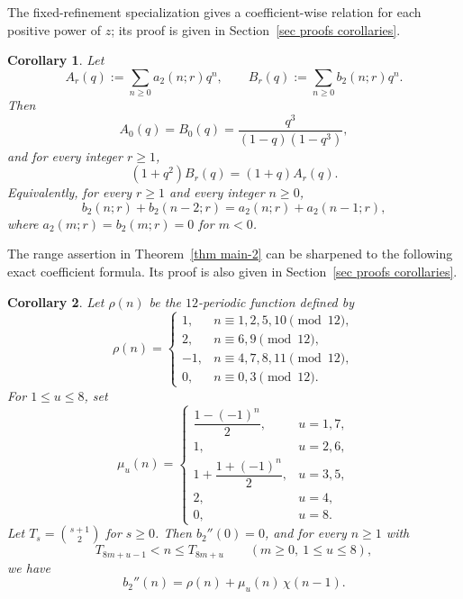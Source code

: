 \documentclass[10pt,a4paper]{amsart}
\newtheorem{corollary}  {Corollary}
\numberwithin{equation}{section}
\begin{document}
The fixed-refinement specialization gives a coefficient-wise relation for each positive power of $z$; its proof is given in Section~\ref{sec proofs corollaries}.
\begin{corollary}\label{cor fixed-r}
Let
\[
A_r(q):=\sum_{n\ge 0} a_2(n;r)q^n,\qquad B_r(q):=\sum_{n\ge 0} b_2(n;r)q^n.
\]
Then
\[
A_0(q)=B_0(q)=\frac{q^3}{(1-q)(1-q^3)},
\]
and for every integer $r\ge 1$,
\begin{equation}\label{eq fixed-r relation}
(1+q^2)B_r(q)=(1+q)A_r(q).
\end{equation}
Equivalently, for every $r\ge 1$ and every integer $n\ge 0$,
\begin{equation}\label{eq fixed-r coeff relation}
b_2(n;r)+b_2(n-2;r)=a_2(n;r)+a_2(n-1;r),
\end{equation}
where $a_2(m;r)=b_2(m;r)=0$ for $m<0$.
\end{corollary}

The range assertion in Theorem~\ref{thm main-2} can be sharpened to the following exact coefficient formula. Its proof is also given in Section~\ref{sec proofs corollaries}.

\begin{corollary}\label{cor exact formula for bpp}
Let $\rho(n)$ be the $12$-periodic function defined by
\[
\rho(n)=
\begin{cases}
1, & n\equiv 1,2,5,10\pmod{12},\\
2, & n\equiv 6,9\pmod{12},\\
-1, & n\equiv 4,7,8,11\pmod{12},\\
0, & n\equiv 0,3\pmod{12}.
\end{cases}
\]
For $1\le u\le 8$, set
\begin{equation}\label{eq mu-definition}
\mu_u(n)=
\begin{cases}
\dfrac{1-(-1)^n}{2}, & u=1,7,\\[6pt]
1, & u=2,6,\\[4pt]
1+\dfrac{1+(-1)^n}{2}, & u=3,5,\\[6pt]
2, & u=4,\\[4pt]
0, & u=8.
\end{cases}
\end{equation}
Let $T_s=\binom{s+1}{2}$ for $s\ge 0$.  Then $b_2''(0)=0$, and for every $n\ge 1$ with
\[
T_{8m+u-1}<n\le T_{8m+u}\qquad (m\ge 0,\ 1\le u\le 8),
\]
we have
\begin{equation}\label{eq exact bpp}
b_2''(n)=\rho(n)+\mu_u(n)\,\chi(n-1).
\end{equation}
\end{corollary}
\end{document}
